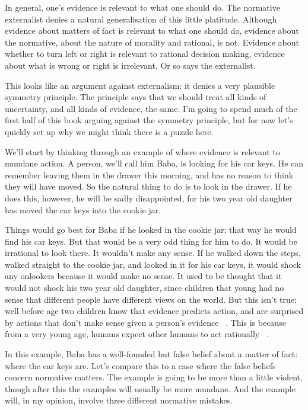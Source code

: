 In general, one's evidence is relevant to what one should do. The normative externalist denies a natural generalisation of this little platitude. Although evidence about matters of fact is relevant to what one should do, evidence about the normative, about the nature of morality and rational, is not. Evidence about whether to turn left or right is relevant to rational decision making, evidence about what is wrong or right is irrelevant. Or so says the externalist.

This looks like an argument against externalism: it denies a very plausible symmetry principle. The principle says that we should treat all kinds of uncertainty, and all kinds of evidence, the same. I'm going to spend much of the first half of this book arguing against the symmetry principle, but for now let's quickly set up why we might think there is a puzzle here.

We'll start by thinking through an example of where evidence is relevant to mundane action. A person, we'll call him \gls{Baba}, is looking for his car keys. He can remember leaving them in the drawer this morning, and has no reason to think they will have moved. So the natural thing to do is to look in the drawer. If he does this, however, he will be sadly disappointed, for his two year old daughter has moved the car keys into the cookie jar.

Things would go best for \gls{Baba} if he looked in the cookie jar; that way he would find his car keys. But that would be a very odd thing for him to do. It would be irrational to look there. It wouldn't make any sense. If he walked down the steps, walked straight to the cookie jar, and looked in it for his car keys, it would shock any onlookers because it would make no sense. It used to be thought that it would not shock his two year old daughter, since children that young had no sense that different people have different views on the world. But this isn't true; well before age two children know that evidence predicts action, and are surprised by actions that don't make sense given a person's evidence ~\citep{HeBolzBaillargeon2011}. This is because from a very young age, humans expect other humans to act rationally ~\citep{ScottBaillargeon2013}.

In this example, \gls{Baba} has a well-founded but false belief about a matter of fact: where the car keys are. Let's compare this to a case where the false beliefs concern normative matters. The example is going to be more than a little violent, though after this the examples will usually be more mundane. And the example will, in my opinion, involve three different normative mistakes.

